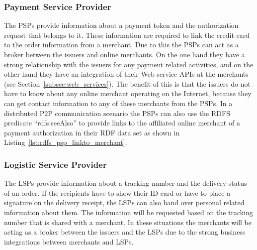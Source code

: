
\subsubsection{Payment Service Provider}
\label{subsub:prep_info_psp}

The \gls{PSP}s provide information about a payment token and the authorization request that belongs to it. These information are required to link the credit card to the order information from a merchant. Due to this the \gls{PSP}s can act as a broker between the issuers and online merchants. On the one hand they have a strong relationship with the issuers for any payment related activities, and on the other hand they have an integration of their Web service \gls{API}s at the merchants (see Section~\ref{subsec:web_services}). The benefit of this is that the issuers do not have to know about any online merchant operating on the Internet, because they can get contact information to any of these merchants from the \gls{PSP}s. In a distributed \gls{P2P} communication scenario the \gls{PSP}s can also use the \gls{RDFS} predicate ``rdfs:seeAlso'' to provide links to the affiliated online merchant of a payment authorization in their \gls{RDF} data set as shown in Listing~\ref{lst:rdfs_psp_linkto_merchant}. \@


\subsubsection{Logistic Service Provider}
\label{subsub:prep_info_lsp}

The \gls{LSP}s provide information about a tracking number and the delivery status of an order. If the recipients have to show their ID card or have to place a signature on the delivery receipt, the \gls{LSP}s can also hand over personal related information about them. The information will be requested based on the tracking number that is shared with a merchant. In these situations the merchants will be acting as a broker between the issuers and the \gls{LSP}s due to the strong business integrations between merchants and \gls{LSP}s.

